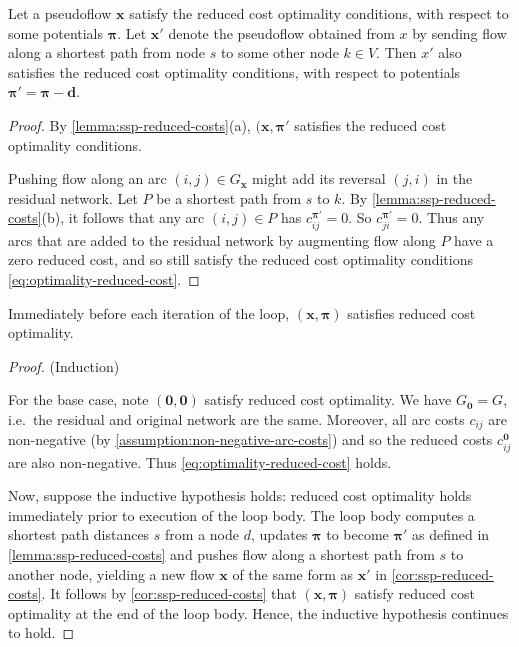 \begin{cor} \label{cor:ssp-reduced-costs}
Let a pseudoflow $\mathbf{x}$ satisfy the reduced cost optimality conditions, with respect to some potentials $\boldsymbol{\pi}$. Let $\mathbf{x}'$ denote the pseudoflow obtained from $x$ by sending flow along a shortest path from node $s$ to some other node $k \in V$. Then $x'$ also satisfies the reduced cost optimality conditions, with respect to potentials $\boldsymbol{\pi}' = \boldsymbol{\pi} - \mathbf{d}$.
\end{cor}
\begin{proof}
By \cref{lemma:ssp-reduced-costs}(a), $(\mathbf{x},\boldsymbol{\pi'}$ satisfies the reduced cost optimality conditions.

Pushing flow along an arc $(i,j) \in G_{\mathbf{x}}$ might add its reversal $(j,i)$ in the residual network. Let $P$ be a shortest path from $s$ to $k$. By \cref{lemma:ssp-reduced-costs}(b), it follows that any arc $(i,j) \in P$ has $c^{\boldsymbol{\pi}'}_{ij} = 0$. So $c^{\boldsymbol{\pi}'}_{ji} = 0$. Thus any arcs that are added to the residual network by augmenting flow along $P$ have a zero reduced cost, and so still satisfy the reduced cost optimality conditions \cref{eq:optimality-reduced-cost}.
\end{proof}

\begin{thm} \label{thm:ssp-invariant}
Immediately before each iteration of the loop, $(\mathbf{x},\boldsymbol{\pi})$ satisfies reduced cost optimality.
\end{thm}
\begin{proof} (Induction)
    
For the base case, note $(\mathbf{0},\mathbf{0})$ satisfy reduced cost optimality. We have $G_{\boldsymbol{0}} = G$, i.e.\ the residual and original network are the same. Moreover, all arc costs $c_{ij}$ are non-negative (by \cref{assumption:non-negative-arc-costs}) and so the reduced costs $c^{\boldsymbol{0}}_{ij}$ are also non-negative. Thus \cref{eq:optimality-reduced-cost} holds.

Now, suppose the inductive hypothesis holds: reduced cost optimality holds immediately prior to execution of the loop body. The loop body computes a shortest path distances $s$ from a node $d$, updates $\boldsymbol{\pi}$ to become $\boldsymbol{\pi'}$ as defined in \cref{lemma:ssp-reduced-costs} and pushes flow along a shortest path from $s$ to another node, yielding a new flow $\mathbf{x}$ of the same form as $\mathbf{x'}$ in \cref{cor:ssp-reduced-costs}. It follows by \cref{cor:ssp-reduced-costs} that $(\mathbf{x},\boldsymbol{\pi})$ satisfy reduced cost optimality at the end of the loop body. Hence, the inductive hypothesis continues to hold.
\end{proof}

